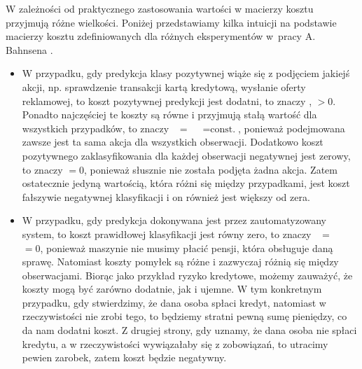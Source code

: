 \documentclass[inzynierska]{pwr_wmat_praca_dyplomowa}
\theoremstyle{plain}
\numberwithin{theorem}{chapter}
\theoremstyle{definition}
\numberwithin{theorem}{chapter}
\begin{document}
W zależności od praktycznego zastosowania wartości w macierzy kosztu przyjmują różne wielkości. Poniżej przedstawiamy kilka intuicji na podstawie macierzy kosztu zdefiniowanych dla różnych eksperymentów w~pracy A. Bahnsena \cite{alej2015ensemble}.
\begin{itemize}
	\item W przypadku, gdy predykcja klasy pozytywnej wiąże się z podjęciem jakiejś akcji, np. sprawdzenie transakcji kartą kredytową, wysłanie oferty reklamowej, to koszt pozytywnej predykcji jest dodatni, to znaczy ,  $>0$. Ponadto najczęściej te koszty są równe i przyjmują stałą wartość dla wszystkich przypadków, to znaczy ~$=$~~$= \text{const.}$, ponieważ podejmowana zawsze jest ta sama akcja dla wszystkich obserwacji. Dodatkowo koszt pozytywnego zaklasyfikowania dla każdej obserwacji negatywnej jest zerowy, to znaczy  $=0$, ponieważ słusznie nie została podjęta żadna akcja. Zatem ostatecznie jedyną wartością, która różni się między przypadkami, jest koszt fałszywie negatywnej klasyfikacji i on również jest większy od zera.
	\item W przypadku, gdy predykcja dokonywana jest przez zautomatyzowany system, to koszt prawidłowej klasyfikacji jest równy zero, to znaczy ~$=$~~$=0$, ponieważ maszynie nie musimy płacić pensji, która obsługuje daną sprawę. Natomiast koszty pomyłek są różne i zazwyczaj różnią się między obserwacjami. Biorąc jako przykład ryzyko kredytowe, możemy zauważyć, że koszty mogą być zarówno dodatnie, jak i ujemne. W tym konkretnym przypadku, gdy stwierdzimy, że dana osoba spłaci kredyt, natomiast w rzeczywistości nie zrobi tego, to będziemy stratni pewną sumę pieniędzy, co da nam dodatni koszt. Z drugiej strony, gdy uznamy, że dana osoba nie spłaci kredytu, a w rzeczywistości wywiązałaby się z zobowiązań, to utracimy pewien zarobek, zatem koszt będzie negatywny.
\end{itemize}
\end{document}
